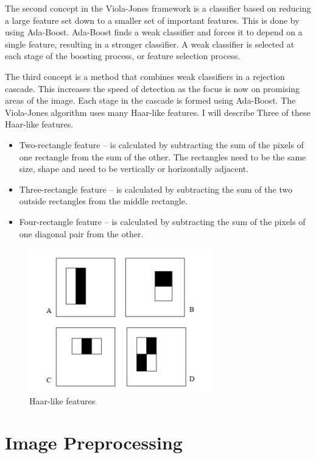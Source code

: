 \begin{flushleft}
The second concept in the Viola-Jones framework \citep{viola} is a classifier based on reducing a large feature set down to a smaller set of important features. This is done by using Ada-Boost. Ada-Boost finds a weak classifier and forces it to depend on a single feature, resulting in a stronger classifier. A weak classifier is selected at each stage of the boosting process, or feature selection process.

The third concept is a method that combines weak classifiers in a rejection cascade. This increases the speed of detection as the focus is now on promising areas of the image. Each stage in the cascade is formed using Ada-Boost. The Viola-Jones algorithm uses many Haar-like features. I will describe Three of these Haar-like features.
\begin{itemize}
  \item Two-rectangle feature -- is calculated by subtracting the sum of the pixels of one rectangle from the sum of the other. The rectangles need to be the same size, shape and need to be vertically or horizontally adjacent.
  \item Three-rectangle feature -- is calculated by subtracting the sum of the two outside rectangles from the middle rectangle.
  \item Four-rectangle feature -- is calculated by subtracting the sum of the pixels of one diagonal pair from the other.
\end{itemize} 
\end{flushleft}
\begin{figure}[H]
  \centering
  \includegraphics[scale=0.8]{2}
  \caption{Haar-like features \citep{viola}}
\end{figure}

\section{Image Preprocessing}
